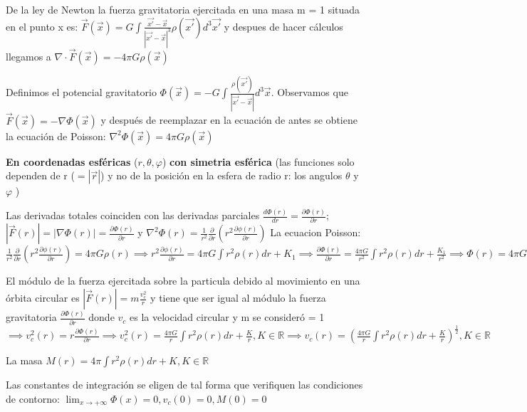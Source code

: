 \documentclass[12pt]{book}
\begin{document}
\begin{description}
\item De la ley de Newton la fuerza gravitatoria ejercitada en una masa m = 1 situada en el punto x es:  $\vec{F}(\vec{x}) = G \int{\frac{\vec{x\prime} - \vec{x}}{|\vec{x\prime} - \vec{x}|^3}\rho(\vec{x\prime})d^3\vec{x\prime}} $ 
y despues de hacer cálculos llegamos a $ \nabla  \cdot  \vec{F}(\vec{x}) = -4\pi G \rho(\vec{x}) $
\item Definimos el potencial gravitatorio $\Phi(\vec{x}) = -G \int{\frac{\rho(\vec{x\prime})}{|\vec{x\prime} - \vec{x}|}d^3\vec{x}} $. 
Observamos que $\vec{F}(\vec{x}) = - \nabla \Phi(\vec{x}) $ 
y después de reemplazar en la ecuación de antes se obtiene la ecuación de Poisson: $\nabla^2 \Phi(\vec{x}) = 4\pi G \rho(\vec{x}) $
\item \textbf{En coordenadas esféricas} ($r,\theta,\varphi$) \textbf{con simetria esférica} 
(las funciones solo dependen de r ($=|\vec{r}|$) y no de la posición en la esfera de radio r: los angulos $\theta$ y $\varphi$ )

Las derivadas totales coinciden con las derivadas parciales $\frac {d\Phi(r)}{dr} = \frac{\partial \Phi(r)}{\partial r} $; 
$|\vec{F}(r)| = |\nabla \Phi(r)| = \frac{\partial \Phi(r)}{\partial r} $ y 
$\nabla^2 \Phi(r) = \frac{1}{r^2} \frac{\partial }{\partial r}(r^2 \frac{\partial \phi(r)}{\partial r})$
La ecuacion Poisson:$ \frac{1}{r^2} \frac{\partial }{\partial r}(r^2 \frac{\partial \phi(r)}{\partial r}) = 4\pi G \rho(r) \implies
r^2 \frac{\partial \phi(r)}{\partial r} = 4\pi G \int{r^2\rho(r)dr} + K_1 \implies
\frac{\partial \Phi(r)}{\partial r} = \frac{4 \pi G}{r^2}\int{r^2\rho(r)dr} + \frac{K_1}{r^2}\implies
\Phi(r) = 4\pi G \int{\frac{1}{r^2}(\int{r^2\rho(r)dr})dr } + K_1\int{\frac{1}{r^2}dr} + K_2
=4\pi G \int{\frac{1}{r^2}(\int{r^2\rho(r)dr})dr } + \frac{K_1}{r} + K_2, K_1, K_2 \in \mathbb{R} (el signo - con K_1)
 $
\item El módulo de la fuerza ejercitada sobre la particula debido al movimiento en una órbita circular es $ |\vec{F}(r)| = m \frac{v_c^2}{r} $ y tiene que ser igual al  módulo la fuerza gravitatoria $\frac{\partial \Phi(r)}{\partial r}$
donde $v_c$ es la velocidad circular y m se consideró = 1
$ \implies v_c^2(r) = r\frac{\partial \Phi(r)}{\partial r} \implies
v_c^2(r) = \frac{4\pi G}{r}\int{r^2\rho(r)dr} + \frac{K}{r}, K \in \mathbb{R} \implies 
v_c(r) = (\frac{4 \pi G}{r}\int{r^2\rho(r)dr} + \frac{K}{r})^{\frac{1}{2}}, K \in \mathbb{R}
$
\item La masa $M(r) = 4 \pi \int{r^2\rho(r)dr} + K, K \in \mathbb{R}$
\item Las constantes de integración se eligen de tal forma que verifiquen las condiciones de contorno:
 $\lim_{x \to +\infty}\Phi(x) = 0, v_c(0) = 0, M(0) = 0$


\end{description}
\end{document}

